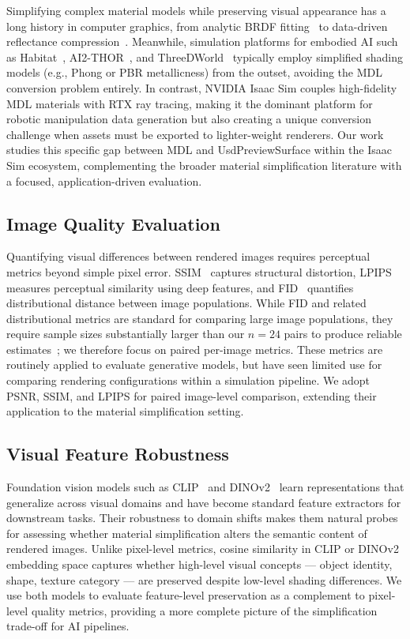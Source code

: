 Simplifying complex material models while preserving visual appearance has a
long history in computer graphics, from analytic BRDF
fitting~\cite{Ngan2005Experimental} to data-driven reflectance
compression~\cite{Sztrajman2021Neural}. Meanwhile, simulation platforms for
embodied AI such as Habitat~\cite{Savva2019Habitat},
AI2-THOR~\cite{Kolve2017AI2THOR}, and
ThreeDWorld~\cite{Gan2021ThreeDWorld} typically employ simplified shading models
(e.g., Phong or PBR metallicness) from the outset, avoiding the MDL conversion
problem entirely. In contrast, NVIDIA Isaac Sim couples high-fidelity MDL
materials with RTX ray tracing, making it the dominant platform for robotic
manipulation data generation but also creating a unique conversion challenge
when assets must be exported to lighter-weight renderers. Our work studies this
specific gap between MDL and UsdPreviewSurface within the Isaac Sim ecosystem,
complementing the broader material simplification literature with a focused,
application-driven evaluation.

\subsection{Image Quality Evaluation}

Quantifying visual differences between rendered images requires perceptual
metrics beyond simple pixel error. SSIM~\cite{Wang2004Image} captures
structural distortion, LPIPS~\cite{Zhang2018Unreasonable} measures perceptual
similarity using deep features, and FID~\cite{Heusel2017GANs} quantifies
distributional distance between image populations. While FID and related
distributional metrics are standard for comparing large image populations, they
require sample sizes substantially larger than our $n=24$ pairs to produce
reliable estimates~\cite{Heusel2017GANs}; we therefore focus on paired per-image
metrics. These metrics are routinely
applied to evaluate generative models, but have seen limited use for comparing
rendering configurations within a simulation pipeline. We adopt PSNR, SSIM,
and LPIPS for paired image-level comparison, extending their application to the
material simplification setting.

\subsection{Visual Feature Robustness}

Foundation vision models such as CLIP~\cite{Radford2021Learning} and
DINOv2~\cite{Oquab2023DINOv2} learn representations that generalize across
visual domains and have become standard feature extractors for downstream
tasks. Their robustness to domain shifts makes them natural probes for assessing
whether material simplification alters the semantic content of rendered images.
Unlike pixel-level metrics, cosine similarity in CLIP or DINOv2 embedding space
captures whether high-level visual concepts --- object identity, shape, texture
category --- are preserved despite low-level shading differences. We use both
models to evaluate feature-level preservation as a complement to pixel-level
quality metrics, providing a more complete picture of the simplification
trade-off for AI pipelines.
